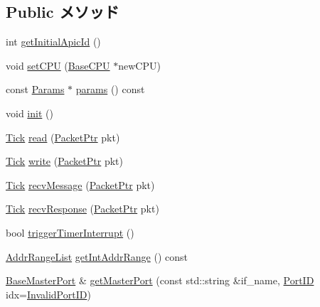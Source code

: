 \subsection*{Public メソッド}
\begin{DoxyCompactItemize}
\item 
int \hyperlink{classX86ISA_1_1Interrupts_a91c9a4205f98f4fe9cef39ae0641002b}{getInitialApicId} ()
\item 
void \hyperlink{classX86ISA_1_1Interrupts_aa209f4cfe10a4390a73aadcf2d176294}{setCPU} (\hyperlink{classBaseCPU}{BaseCPU} $\ast$newCPU)
\item 
const \hyperlink{classX86ISA_1_1Interrupts_a3c48a671abef695247afdd48259ac20a}{Params} $\ast$ \hyperlink{classX86ISA_1_1Interrupts_acd3c3feb78ae7a8f88fe0f110a718dff}{params} () const 
\item 
void \hyperlink{classX86ISA_1_1Interrupts_a02fd73d861ef2e4aabb38c0c9ff82947}{init} ()
\item 
\hyperlink{base_2types_8hh_a5c8ed81b7d238c9083e1037ba6d61643}{Tick} \hyperlink{classX86ISA_1_1Interrupts_a613ec7d5e1ec64f8d21fec78ae8e568e}{read} (\hyperlink{classPacket}{PacketPtr} pkt)
\item 
\hyperlink{base_2types_8hh_a5c8ed81b7d238c9083e1037ba6d61643}{Tick} \hyperlink{classX86ISA_1_1Interrupts_a4cefab464e72b5dd42c003a0a4341802}{write} (\hyperlink{classPacket}{PacketPtr} pkt)
\item 
\hyperlink{base_2types_8hh_a5c8ed81b7d238c9083e1037ba6d61643}{Tick} \hyperlink{classX86ISA_1_1Interrupts_a3dad3b561a1022eee5fab74df92ce766}{recvMessage} (\hyperlink{classPacket}{PacketPtr} pkt)
\item 
\hyperlink{base_2types_8hh_a5c8ed81b7d238c9083e1037ba6d61643}{Tick} \hyperlink{classX86ISA_1_1Interrupts_a96d1a00beed669f9145d55bc3675d99c}{recvResponse} (\hyperlink{classPacket}{PacketPtr} pkt)
\item 
bool \hyperlink{classX86ISA_1_1Interrupts_a07d266f0ad36cfec987f7487aa2c54cc}{triggerTimerInterrupt} ()
\item 
\hyperlink{classstd_1_1list}{AddrRangeList} \hyperlink{classX86ISA_1_1Interrupts_ad86b339471781a0d7634d3c41c6a1c87}{getIntAddrRange} () const 
\item 
\hyperlink{classBaseMasterPort}{BaseMasterPort} \& \hyperlink{classX86ISA_1_1Interrupts_ac66222ec5b6b7beb5d1189c07778bc8a}{getMasterPort} (const std::string \&if\_\-name, \hyperlink{base_2types_8hh_acef4d7d41cb21fdc252e20c04cd7bb8e}{PortID} idx=\hyperlink{base_2types_8hh_a65bf40f138cf863f0c5e2d8ca1144126}{InvalidPortID})

\end{DoxyCompactItemize}
